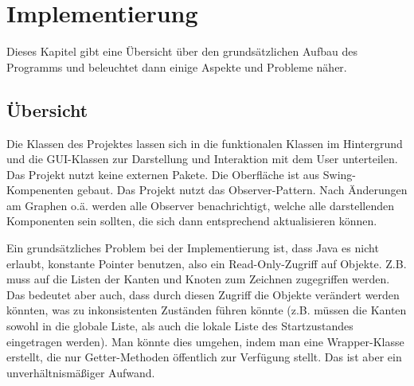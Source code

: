 \chapter{Implementierung}\label{Implementierung}
Dieses Kapitel gibt eine Übersicht über den grundsätzlichen Aufbau des Programms und beleuchtet dann einige Aspekte und Probleme näher.
\section{Übersicht}
Die Klassen des Projektes lassen sich in die funktionalen Klassen im Hintergrund und die GUI-Klassen zur Darstellung und Interaktion mit dem User unterteilen. Das Projekt nutzt keine externen Pakete. Die Oberfläche ist aus Swing-Kompenenten gebaut. Das Projekt nutzt das Observer-Pattern. Nach Änderungen am Graphen o.ä. werden alle Observer benachrichtigt, welche alle darstellenden Komponenten sein sollten, die sich dann entsprechend aktualisieren können.

Ein grundsätzliches Problem bei der Implementierung ist, dass Java es nicht erlaubt, konstante Pointer benutzen, also ein Read-Only-Zugriff auf Objekte. Z.B. muss auf die Listen der Kanten und Knoten zum Zeichnen zugegriffen werden. Das bedeutet aber auch, dass durch diesen Zugriff die Objekte verändert werden könnten, was zu inkonsistenten Zuständen führen könnte (z.B. müssen die Kanten sowohl in die globale Liste, als auch die lokale Liste des Startzustandes eingetragen werden). Man könnte dies umgehen, indem man eine Wrapper-Klasse erstellt, die nur Getter-Methoden öffentlich zur Verfügung stellt. Das ist aber ein unverhältnismäßiger Aufwand.
